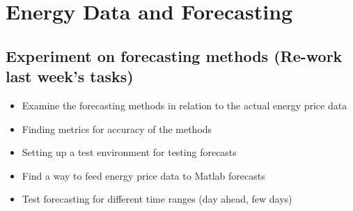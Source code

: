 \documentclass[a4paper]{article}
\begin{document}
\vspace{1em}

\hfill\date{Week 17, from 21.04. to 27.04.}

\section{Energy Data and Forecasting}

\subsection{Experiment on forecasting methods (Re-work last week's tasks)}

\begin{itemize}

\item Examine the forecasting methods in relation to the actual energy price data

\item Finding metrics for accuracy of the methods

\item Setting up a test environment for testing forecasts

\item Find a way to feed energy price data to Matlab forecasts

\item Test forecasting for different time ranges (day ahead, few days)

\end{itemize}
\end{document}
